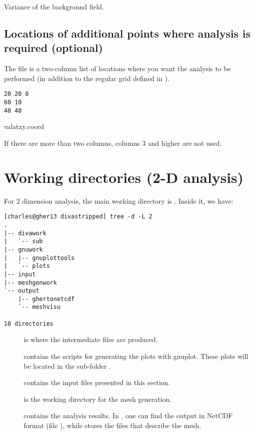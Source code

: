 Variance of the background field. 


\subsection[Additional points of analysis]{Locations of additional points where analysis is required (optional)}

The file  is a two-column list of locations where you want the analysis to be performed (in addition to the regular grid defined in ).  

\begin{exfile}[htpb]
\begin{footnotesize}
\texttt{20 20 0\\
60 10\\
40 40} 
\end{footnotesize}
\caption{valatxy.coord\label{ex:valatxy}}
\end{exfile}

If there are more than two columns, columns 3 and higher are not used.


\section{Working directories (2-D analysis)}

For 2 dimension analysis, the main working directory is . Inside it, we have:
\begin{lstlisting}[style=Bash]
[charles@gher13 divastripped] tree -d -L 2
.
|-- divawork
|   `-- sub
|-- gnuwork
|   |-- gnuplottools
|   `-- plots
|-- input
|-- meshgenwork
`-- output
    |-- ghertonetcdf
    `-- meshvisu

10 directories
\end{lstlisting}


\begin{description}

\item[] is where the intermediate files are produced.
\item[] contains the scripts for generating the plots with gnuplot. These plots will be located in the sub-folder .
\item[] contains the input files presented in this section.
\item[] is the working directory for the mesh generation.
\item[] contains the analysis results. In , one can find the output in NetCDF format (file ), while  stores the files that describe the mesh.
\end{description}